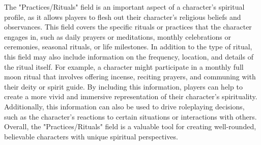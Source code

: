 \documentclass[12pt]{book}
\begin{document}
The "Practices/Rituals" field is an important aspect of a character's spiritual profile, as it allows players to flesh out their character's religious beliefs and observances. This field covers the specific rituals or practices that the character engages in, such as daily prayers or meditations, monthly celebrations or ceremonies, seasonal rituals, or life milestones. In addition to the type of ritual, this field may also include information on the frequency, location, and details of the ritual itself. For example, a character might participate in a monthly full moon ritual that involves offering incense, reciting prayers, and communing with their deity or spirit guide. By including this information, players can help to create a more vivid and immersive representation of their character's spirituality. Additionally, this information can also be used to drive roleplaying decisions, such as the character's reactions to certain situations or interactions with others. Overall, the "Practices/Rituals" field is a valuable tool for creating well-rounded, believable characters with unique spiritual perspectives.
\end{document}
